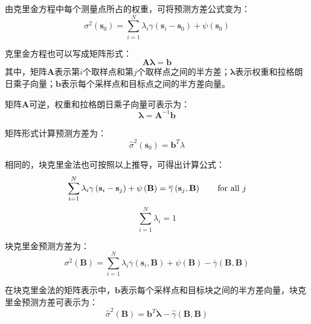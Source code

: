 由克里金方程中每个测量点所占的权重，可将预测方差公式变为：
\begin{equation}
    \sigma^{2}\left( \mathbf{s}_{0} \right) = \sum_{i=1}^{N} \lambda_{i} \gamma \left( \mathbf{s}_{i} - \mathbf{s}_{0} \right) + \psi \left( \mathbf{s}_{0} \right)
    \label{点克里金法预测方差公式}
\end{equation}

克里金方程也可以写成矩阵形式：
\begin{equation}
    \mathbf{A} \mathbf{\lambda} = \mathbf{b}
    \label{点克里金方程矩阵形式}
\end{equation}
其中，矩阵$ \mathbf{A} $表示第$ i $个取样点和第$ j $个取样点之间的半方差；$ \mathbf{\lambda} $表示权重和拉格朗日乘子向量；$ \mathbf{b} $表示每个采样点和目标点之间的半方差向量。

矩阵$ \mathbf{A} $可逆，权重和拉格朗日乘子向量可表示为：
\begin{equation}
    \mathbf{\lambda} = \mathbf{A}^{-1} \mathbf{b}
    \label{点克里金方程逆矩阵计算权重}
\end{equation}

矩阵形式计算预测方差为：
\begin{equation}
    \hat{\sigma}^{2} \left( \mathbf{s}_{0} \right) = \mathbf{b}^{T} \lambda
    \label{点克里金方程矩阵形式计算预测方差}
\end{equation}

相同的，块克里金法也可按照以上推导，可得出计算公式：
\begin{equation}
    \sum_{i=1}^{N} \lambda_{i} \gamma \left( \mathbf{s}_{i} - \mathbf{s}_{j} \right) + \psi \left( \mathbf{B} \right) = \overline{\gamma} \left( \mathbf{s}_{j} , \mathbf{B} \right) \qquad \text{for all $ j $}
\end{equation}
\begin{equation}
    \sum_{i=1}^{N} \lambda_{i} = 1
\end{equation}

块克里金预测方差为：
\begin{equation}
    \sigma^{2}\left( \mathbf{B} \right) = \sum_{i=1}^{N} \lambda_{i} \overline{\gamma} \left( \mathbf{s}_{i} , \mathbf{B} \right) + \psi \left( \mathbf{B} \right) - \overline{\gamma} \left( \mathbf{B} , \mathbf{B} \right)
\end{equation}

在块克里金法的矩阵表示中，$ \mathbf{b} $表示每个采样点和目标块之间的半方差向量，块克里金预测方差可表示为：
\begin{equation}
    \hat{\sigma}^{2} \left( \mathbf{B} \right) = \mathbf{b}^{T} \mathbf{\lambda} - \hat{\gamma} \left( \mathbf{B} , \mathbf{B} \right)
\end{equation}

